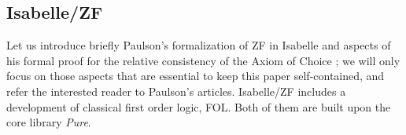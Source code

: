 \subsection{Isabelle/ZF}

Let us introduce briefly Paulson's formalization of ZF
\cite{paulson2017isabelle} in Isabelle and aspects of his formal proof
for the relative consistency of the Axiom of Choice
\cite{paulson_2003}; we will only focus on those aspects that are
essential to keep this paper self-contained, and refer the interested
reader to Paulson's articles. 
Isabelle/ZF includes a development of classical first order logic,
FOL. Both of them are  built upon the core library \emph{Pure}. 

